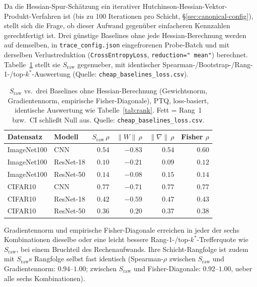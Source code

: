 Da die Hessian-Spur-Schätzung ein iterativer Hutchinson-Hessian-Vektor-Produkt-Verfahren ist (bis zu 100 Iterationen pro Schicht, \S\ref{sec:canonical-config}), stellt sich die Frage, ob dieser Aufwand gegenüber einfacheren Kennzahlen gerechtfertigt ist. Drei günstige Baselines ohne jede Hessian-Berechnung werden auf demselben, in \texttt{trace\_config.json} eingefrorenen Probe-Batch und mit derselben Verlustreduktion (\texttt{CrossEntropyLoss}, \texttt{reduction=" mean"}) berechnet. Tabelle~\ref{tab:cheapbaselines} stellt sie $S_{\mathrm{raw}}$ gegenueber, mit identischer Spearman-/Bootstrap-/Rang-1-/top-$k^*$-Auswertung (Quelle: \texttt{cheap\_baselines\_loss.csv}).

\begin{table}[t]
\centering
\small
\caption{$S_{\mathrm{raw}}$ vs.\ drei Baselines ohne Hessian-Berechnung (Gewichtsnorm, Gradientennorm, empirische Fisher-Diagonale), PTQ, loss-basiert, identische Auswertung wie Tabelle~\ref{tab:rank}. Fett = Rang~1 bzw.\ CI schließt Null aus. Quelle: \texttt{cheap\_baselines\_loss.csv}.}
\label{tab:cheapbaselines}
\begin{tabular}{ll rrrr}
\toprule
Datensatz & Modell & $S_{\mathrm{raw}}\,\rho$ & $\|W\|\,\rho$ & $\|\nabla\|\,\rho$ & Fisher $\rho$ \\
\midrule
ImageNet100 & CNN        & $0.54$        & $-0.83$ & $0.54$        & $0.60$ \\
ImageNet100 & ResNet-18  & $\mathbf{0.10}$ & $-0.21$ & $0.09$        & $\mathbf{0.12}$ \\
ImageNet100 & ResNet-50  & $\mathbf{0.14}$ & $-0.08$ & $\mathbf{0.15}$ & $\mathbf{0.14}$ \\
CIFAR10     & CNN        & $0.77$        & $-0.71$ & $0.77$        & $0.77$ \\
CIFAR10     & ResNet-18  & $\mathbf{0.42}$ & $-0.59$ & $\mathbf{0.47}$ & $\mathbf{0.43}$ \\
CIFAR10     & ResNet-50  & $0.36$        & $0.20$  & $0.37$        & $0.38$ \\
\bottomrule
\end{tabular}
\end{table}

Gradientennorm und empirische Fisher-Diagonale erreichen in jeder der sechs Kombinationen dieselbe oder eine leicht bessere Rang-1-/top-$k^*$-Trefferquote wie $S_{\mathrm{raw}}$, bei einem Bruchteil des Rechenaufwands. Ihre Schicht-Rangfolge ist zudem mit $S_{\mathrm{raw}}$s Rangfolge selbst fast identisch (Spearman-$\rho$ zwischen $S_{\mathrm{raw}}$ und Gradientennorm: $0.94$--$1.00$; zwischen $S_{\mathrm{raw}}$ und Fisher-Diagonale: $0.92$--$1.00$, ueber alle sechs Kombinationen).

